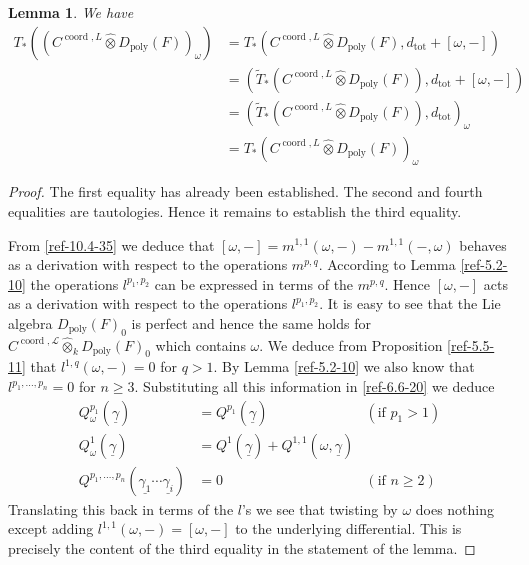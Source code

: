 \documentclass{amsart}
\numberwithin{equation}{section}
\let\cal\mathcal
\newtheorem{lemma}{Lemma}[section]
\theoremstyle{definition}
\theoremstyle{remark}
\begin{document}
\begin{lemma} We have
\begin{align*}
T_\ast((C^{{\operatorname{coord}},L} {\mathbin{\hat{\otimes}}} D_{\operatorname{poly}}(F))_{\omega})&=
T_\ast(C^{{\operatorname{coord}},L} {\mathbin{\hat{\otimes}}} D_{\operatorname{poly}}(F), d_{\text{tot}}+[\omega,-])\\
&=
(\widetilde{T}_\ast(C^{{\operatorname{coord}},L} {\mathbin{\hat{\otimes}}} D_{\operatorname{poly}}(F)),d_{\text{tot}}+[\omega,-])\\
&=(\widetilde{T}_\ast(C^{{\operatorname{coord}},L} {\mathbin{\hat{\otimes}}} D_{\operatorname{poly}}(F)),d_{\text{tot}})_\omega\\
&=T_\ast(C^{{\operatorname{coord}},L} {\mathbin{\hat{\otimes}}} D_{\operatorname{poly}}(F))_\omega
\end{align*}
\end{lemma}
\begin{proof} The first equality has already been established. The
second and fourth equalities are tautologies. Hence it remains
to establish the third equality. 

From \eqref{ref-10.4-35} we deduce that
$[\omega,-]=m^{1,1}(\omega,-)-m^{1,1}(-,\omega)$ behaves as a derivation
with respect to the operations $m^{p,q}$.
According to Lemma \ref{ref-5.2-10} the operations $l^{p_1,p_2}$ can be
expressed in terms of the $m^{p,q}$. Hence $[\omega,-]$ acts as a
derivation with respect to the operations $l^{p_1,p_2}$. It is easy to see
that the Lie algebra $D_{\operatorname{poly}}(F)_0$ is perfect and hence the same holds
for $C^{{\operatorname{coord}},{{\cal L}}}{\mathbin{\hat{\otimes}}}_k D_{\operatorname{poly}}(F)_0$ which contains $\omega$.  
We deduce from
Proposition \ref{ref-5.5-11} that $l^{1,q}(\omega,-)=0$ for $q>1$.
By Lemma \ref{ref-5.2-10} we also know that $l^{p_1,\dots,p_n}=0$ for $n\ge 3$.
Substituting all this information in \eqref{ref-6.6-20} we deduce
\begin{align*}
  Q^{p_1}_\omega(\underline{\gamma})&=Q^{p_1}(\underline{\gamma})&
  (\text{if $p_1>1$})\\
  Q^{1}_\omega(\underline{\gamma})&=Q^1(\underline{\gamma})+Q^{1,1}(\omega,\underline{\gamma})\\
Q^{p_1,\dots,p_n}(\underline{\gamma_1}\cdots \underline{\gamma_i})&=0&
(\text{if $n\ge 2$})
\end{align*}
Translating this back in terms of the $l$'s we see that twisting by
$\omega$ does nothing except adding $l^{1,1}(\omega,-)=[\omega,-]$ to
the underlying differential. This is precisely the content of the
third equality in the statement of the lemma. 
\end{proof}
\end{document}
